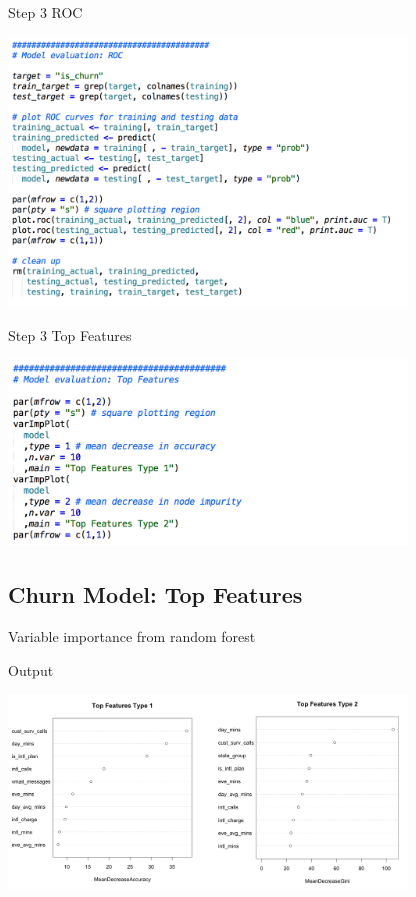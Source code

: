\documentclass[10pt]{beamer}
\begin{document}
    \begin{frame}{Step 3 ROC}
        \begin{center}
          \includegraphics[width=300pt]{../graphs/demo_r_step_3_2}
        \end{center}
    \end{frame}

    \begin{frame}{Step 3 Top Features}
        \begin{center}
          \includegraphics[width=300pt]{../graphs/demo_r_step_3_3}
        \end{center}
    \end{frame}
    
  \subsection{Churn Model: Top Features}
  
    \begin{frame}{Variable importance from random forest}
      \begin{block}{Output}
        \begin{center}
          \includegraphics[width=300pt]{../graphs/rf_var_importance}
        \end{center}
      \end{block}
    \end{frame}
\end{document}
